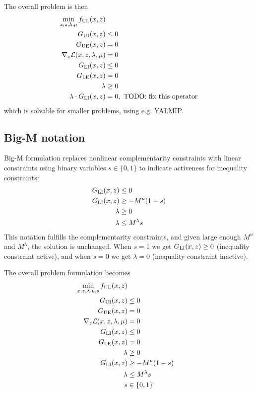 The overall problem is then
\begin{equation}
\begin{split}
    \min_{x,z,\lambda,\mu} f_\mathrm{UL}(x,z) & \\
    G_\mathrm{UI}(x,z) & \leq 0 \\
    G_\mathrm{UE}(x,z) &= 0 \\
    \nabla_z \mathcal{L}(x,z,\lambda,\mu) &= 0 \\
    G_\mathrm{LI}(x,z) &\leq 0 \\
    G_\mathrm{LE}(x,z) &= 0 \\
    \lambda &\geq 0 \\
    \lambda \cdot G_\mathrm{LI}(x,z) &= 0, \mbox{ TODO: fix this operator}
\end{split}
\end{equation}
%
which is solvable for smaller problems, using e.g. YALMIP.

\subsection{Big-M notation}
Big-M formulation replaces nonlinear complementarity constraints with linear constraints using binary variables $s \in \{0,1\}$ to indicate activeness for inequality constraints:
\begin{equation}\label{eq:big-M}
\begin{split}
    G_\mathrm{LI}(x,z) &\leq 0 \\
    G_\mathrm{LI}(x,z) &\geq -M^u(1-s) \\
    \lambda        &\geq 0 \\
    \lambda        &\leq M^\lambda s
\end{split}
\end{equation}
This notation fulfills the complementarity constraints, and given large enough $M^u$ and $M^\lambda$, the solution is unchanged. When $s = 1$ we get $G_\mathrm{LI}(x,z) \geq 0$ (inequality constraint active), and when $s = 0$ we get $\lambda = 0$ (inequality constraint inactive).

The overall problem formulation becomes
\begin{equation}
\begin{split}
    \min_{x,z,\lambda,\mu,s} f_\mathrm{UL}(x,z) \\
    G_\mathrm{UI}(x,z) & \leq 0 \\
    G_\mathrm{UE}(x,z) &= 0 \\
    \nabla_z \mathcal{L}(x,z,\lambda,\mu) &= 0 \\
    G_\mathrm{LI}(x,z) &\leq 0 \\
    G_\mathrm{LE}(x,z) &= 0 \\
    \lambda &\geq 0 \\
    G_\mathrm{LI}(x,z) &\geq -M^u(1-s) \\
    \lambda &\leq M^\lambda s \\
    s &\in \{0,1\}
\end{split}
\end{equation}

